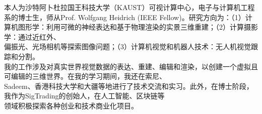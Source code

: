 

\begin{cvparagraph}
本人为沙特阿卜杜拉国王科技大学（KAUST）可视计算中心，电子与计算机工程系的博士生，师从Prof. Wolfgang Heidrich (IEEE Fellow)。研究方向为：（1）计算机图形学：利用可微的神经表达和基于物理渲染的实景三维重建；（2）计算摄影学：通过近红外、\\偏振光、光场相机等探索图像问题；（3）计算机视觉和机器人技术：无人机视觉跟踪和分割。\\
我的工作涉及对真实世界视觉数据的表达、重建、编辑和渲染，以创建一个虚拟且可编辑的三维世界。在我的学习期间，我还在索尼、\\Sadeem、香港科技大学和大疆等地进行了技术交流和实习。此外，在博士阶段，我作为SigTrading的创始人，在人工智能、区块链等\\领域积极探索各种创业和技术商业化项目。
\end{cvparagraph}

